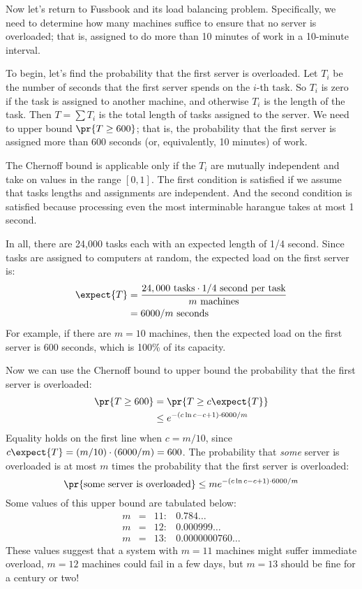 Now let's return to Fussbook and its load balancing problem.
Specifically, we need to determine how many machines suffice to ensure
that no server is overloaded; that is, assigned to do more than 10
minutes of work in a 10-minute interval.

To begin, let's find the probability that the first server is
overloaded.  Let $T_i$ be the number of seconds that the first server
spends on the $i$-th task.  So $T_i$ is zero if the task is assigned
to another machine, and otherwise $T_i$ is the length of the task.
Then $T = \sum T_i$ is the total length of tasks assigned to the
server.  We need to upper bound $\pr{T \geq 600}$; that is, the
probability that the first server is assigned more than 600 seconds
(or, equivalently, 10 minutes) of work.

The Chernoff bound is applicable only if the $T_i$ are mutually
independent and take on values in the range $[0, 1]$.  The first
condition is satisfied if we assume that tasks lengths and assignments
are independent.  And the second condition is satisfied because
processing even the most interminable harangue takes at most 1 second.

In all, there are 24,000 tasks each with an expected length of 1/4
second.  Since tasks are assigned to computers at random, the expected
load on the first server is:
\begin{align*}
\expect{T} & = \frac{24,000 \mbox{ tasks} \cdot 1/4 \mbox{ second per task}}
  {m \mbox{ machines}} \\
  & = 6000 / m \mbox{ seconds}
\end{align*}
For example, if there are $m = 10$ machines, then the expected load on
the first server is 600 seconds, which is 100\% of its capacity.

Now we can use the Chernoff bound to upper bound the probability that
the first server is overloaded:
\begin{align*}
\pr{T \geq 600} & = \pr{T \geq c \expect{T}} \\
  & \leq e^{-(c \ln c - c + 1) \cdot 6000 / m}
\end{align*}
Equality holds on the first line when $c = m / 10$, since $c \expect{T} =
(m / 10) \cdot (6000 / m) = 600$.  The probability that {\em some}
server is overloaded is at most $m$ times the probability that the
first server is overloaded:
\[
\pr{\mbox{some server is overloaded}} \leq m e^{-(c \ln c - c + 1) \cdot 6000 / m}
\]
Some values of this upper bound are tabulated below:
\[
\begin{array}{rcll}
m & = & 11: & 0.784\dots \\
m & = & 12: & 0.000999\dots \\
m & = & 13: & 0.0000000760\dots
\end{array}
\]
These values suggest that a system with $m = 11$ machines might suffer
immediate overload, $m = 12$ machines could fail in a few days, but $m
= 13$ should be fine for a century or two!

